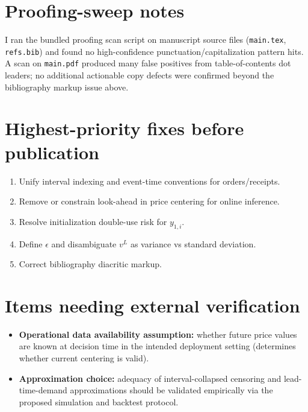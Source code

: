 \documentclass[11pt]{article}
\begin{document}
\section*{Proofing-sweep notes}

I ran the bundled proofing scan script on manuscript source files (\texttt{main.tex}, \texttt{refs.bib}) and found no high-confidence punctuation/capitalization pattern hits.
A scan on \texttt{main.pdf} produced many false positives from table-of-contents dot leaders; no additional actionable copy defects were confirmed beyond the bibliography markup issue above.

\section*{Highest-priority fixes before publication}

\begin{enumerate}
  \item Unify interval indexing and event-time conventions for orders/receipts.
  \item Remove or constrain look-ahead in price centering for online inference.
  \item Resolve initialization double-use risk for $y_{1,i}$.
  \item Define $\epsilon$ and disambiguate $v^L$ as variance vs standard deviation.
  \item Correct bibliography diacritic markup.
\end{enumerate}

\section*{Items needing external verification}

\begin{itemize}
  \item \textbf{Operational data availability assumption:} whether future price values are known at decision time in the intended deployment setting (determines whether current centering is valid).
  \item \textbf{Approximation choice:} adequacy of interval-collapsed censoring and lead-time-demand approximations should be validated empirically via the proposed simulation and backtest protocol.
\end{itemize}
\end{document}
